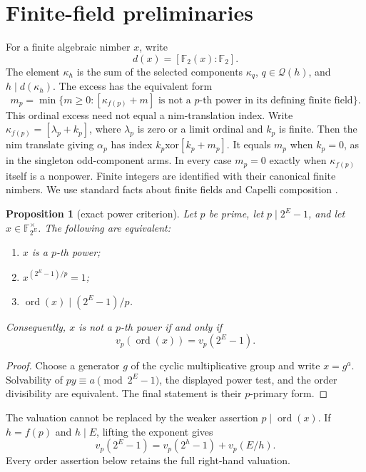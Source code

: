 \documentclass[11pt]{article}
\newtheorem{proposition}[theorem]{Proposition}
\theoremstyle{definition}
\theoremstyle{remark}
\begin{document}
\section{Finite-field preliminaries}\label{sec:prelim}

For a finite algebraic nimber $x$, write
\[
  d(x)=[\mathbb F_2(x):\mathbb F_2].
\]
The element $\kappa_h$ is the sum of the selected components
$\kappa_q$, $q\in\mathcal Q(h)$, and $h\mid d(\kappa_h)$.  The excess has
the equivalent form
\[
  m_p=\min\{m\geq0:[\kappa_{f(p)}+m]
      \text{ is not a $p$-th power in its defining finite field}\}.
\]
This ordinal excess need not equal a nim-translation index.  Write
$\kappa_{f(p)}=[\lambda_p+k_p]$, where $\lambda_p$ is zero or a limit
ordinal and $k_p$ is finite.  Then the nim translate giving $\alpha_p$ has
index $k_p\mathbin{\mathrm{xor}}[k_p+m_p]$.  It equals $m_p$ when $k_p=0$,
as in the singleton odd-component arms.  In every case $m_p=0$ exactly when
$\kappa_{f(p)}$ itself is a nonpower.  Finite integers are identified with
their canonical finite nimbers.  We use
standard facts about finite fields and Capelli composition
\cite{lidlniederreiter1997}.

\begin{proposition}[exact power criterion]\label{prop:power}
Let $p$ be prime, let $p\mid2^E-1$, and let
$x\in\mathbb F_{2^E}^{\times}$.  The following are equivalent:
\begin{enumerate}
\item $x$ is a $p$-th power;
\item $x^{(2^E-1)/p}=1$;
\item $\operatorname{ord}(x)\mid(2^E-1)/p$.
\end{enumerate}
Consequently, $x$ is not a $p$-th power if and only if
\[
  v_p(\operatorname{ord}(x))=v_p(2^E-1).
\]
\end{proposition}

\begin{proof}
Choose a generator $g$ of the cyclic multiplicative group and write
$x=g^a$.  Solvability of $py\equiv a\pmod{2^E-1}$, the displayed power
test, and the order divisibility are equivalent.  The final statement is
their $p$-primary form.
\end{proof}

The valuation cannot be replaced by the weaker assertion
$p\mid\operatorname{ord}(x)$.  If $h=f(p)$ and $h\mid E$, lifting the
exponent gives
\[
  v_p(2^E-1)=v_p(2^h-1)+v_p(E/h).
\]
Every order assertion below retains the full right-hand valuation.
\end{document}
